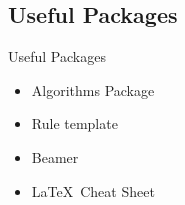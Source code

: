 \documentclass{beamer}
\begin{document}
\subsection{Useful Packages}
\begin{frame}{Useful Packages}
\begin{itemize}
\item Algorithms Package
\item Rule template
\item Beamer
\item \LaTeX\ Cheat Sheet
\end{itemize}
\end{frame}
\end{document}
